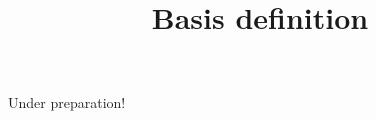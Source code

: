 \documentclass[12pt,a4paper]{article}
\title{Basis definition}
\begin{document}
	\maketitle


Under preparation!
	
\end{document}
